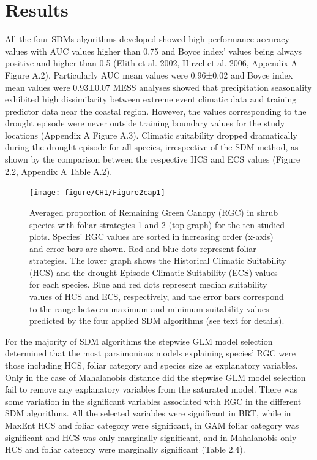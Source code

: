\documentclass[11pt,twoside]{reedthesis}
\begin{document}
\section{Results}\label{results}

All the four SDMs algorithms developed showed high performance accuracy
values with AUC values higher than 0.75 and Boyce index' values being
always positive and higher than 0.5 (Elith et al. 2002, Hirzel et al.
2006, Appendix A Figure A.2). Particularly AUC mean values were
0.96±0.02 and Boyce index mean values were 0.93±0.07 MESS analyses
showed that precipitation seasonality exhibited high dissimilarity
between extreme event climatic data and training predictor data near the
coastal region. However, the values corresponding to the drought episode
were never outside training boundary values for the study locations
(Appendix A Figure A.3). Climatic suitability dropped dramatically
during the drought episode for all species, irrespective of the SDM
method, as shown by the comparison between the respective HCS and ECS
values (Figure 2.2, Appendix A Table A.2).\par

\setlength{\abovecaptionskip}{0pt}
\begin{figure}[hbt!]

{\centering \texttt{[image: figure/CH1/Figure2cap1]} 

}

\caption[Remaining Green Canopy (RGC) compared with historical (HCS) and episodic (ECS) climatic suitability]{Averaged proportion of Remaining Green Canopy (RGC) in shrub species with foliar strategies 1 and 2 (top graph) for the ten studied plots. Species’ RGC values are sorted in increasing order (x-axis) and error bars are shown. Red and blue dots represent foliar strategies. The lower graph shows the Historical Climatic Suitability (HCS) and the drought Episode Climatic Suitability (ECS) values for each species. Blue and red dots represent median suitability values of HCS and ECS, respectively, and the error bars correspond to the range between maximum and minimum suitability values predicted by the four applied SDM algorithms (see text for details).}\label{fig:Ch1plot2}
\end{figure}
For the majority of SDM algorithms the stepwise GLM model selection
determined that the most parsimonious models explaining species' RGC
were those including HCS, foliar category and species size as
explanatory variables. Only in the case of Mahalanobis distance did the
stepwise GLM model selection fail to remove any explanatory variables
from the saturated model. There was some variation in the significant
variables associated with RGC in the different SDM algorithms. All the
selected variables were significant in BRT, while in MaxEnt HCS and
foliar category were significant, in GAM foliar category was significant
and HCS was only marginally significant, and in Mahalanobis only HCS and
foliar category were marginally significant (Table 2.4).\par
\end{document}
